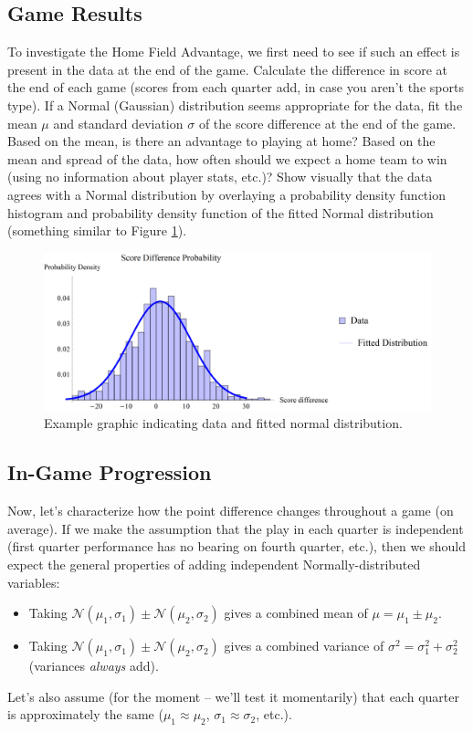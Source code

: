 \documentclass{article}
\begin{document}
\subsection{Game Results}
\label{sec:results}
To investigate the Home Field Advantage, we first need to see if such an effect is present in the data at the end of the game. Calculate the difference in score at the end of each game
(scores from each quarter add, in case you aren't the sports type). If a Normal (Gaussian) distribution seems appropriate for the data, fit the mean $\mu$ and standard deviation $\sigma$
of the score difference at the end of the game. Based on the mean, is there an advantage to playing at home? Based on the mean and spread of the data, how often should we
expect a home team to win (using no information about player stats, etc.)? Show visually that the data agrees with a Normal distribution by overlaying a probability
density function histogram and probability density function of the fitted Normal distribution (something similar to Figure \ref{fig:normal}).

\begin{figure}
\begin{center}
\includegraphics[scale=.7]{normalfit.png}
\caption{Example graphic indicating data and fitted normal distribution.}
\label{fig:normal}
\end{center}
\end{figure}

\subsection{In-Game Progression}
\label{sec:progression}
Now, let's characterize how the point difference changes throughout a game (on average). If we make the assumption that the play in each quarter is independent
(first quarter performance has no bearing on fourth quarter, etc.), then we should expect the general properties of adding independent Normally-distributed variables:
\begin{itemize}
\item{Taking $\mathcal{N}(\mu_1,\sigma_1)\pm\mathcal{N}(\mu_2,\sigma_2)$ gives a combined mean of $\mu=\mu_1\pm\mu_2$.}
\item{Taking $\mathcal{N}(\mu_1,\sigma_1)\pm\mathcal{N}(\mu_2,\sigma_2)$ gives a combined variance of $\sigma^2=\sigma_1^2+\sigma_2^2$ (variances \textit{always} add).}
\end{itemize}
Let's also assume (for the moment -- we'll test it momentarily) that each quarter is approximately the same ($\mu_1\approx\mu_2$, $\sigma_1\approx\sigma_2$, etc.).
\end{document}
